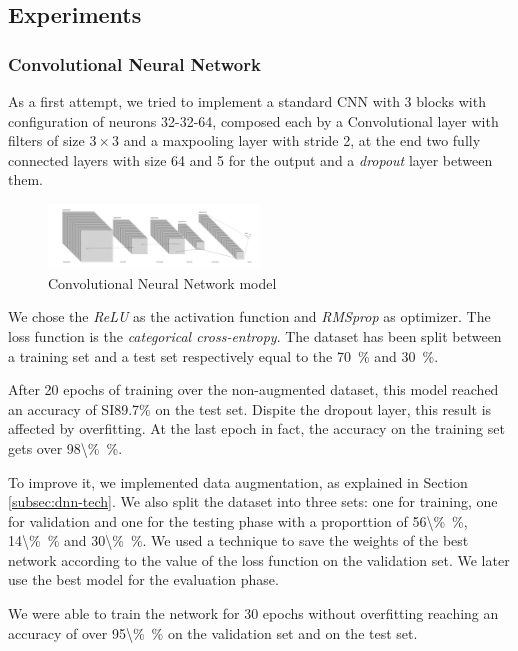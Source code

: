 \documentclass{article}
\begin{document}
\subsection{Experiments}
\label{subsec:dnn-experiments}

\subsubsection{Convolutional Neural Network}
As a first attempt, we tried to implement a standard CNN with 3 blocks with configuration of neurons 32-32-64, composed each by a Convolutional layer with filters of size $3\times 3$ and a maxpooling layer with stride 2, at the end two fully connected layers with size 64 and 5 for the output and a \emph{dropout} layer between them.
\begin{figure}[h]
    \centering
    \includegraphics[width=0.5\textwidth]{img/cnn_figure.PNG}
    \caption{Convolutional Neural Network model}
    \label{fig:CNN model}
\end{figure}

We chose the \emph{ReLU} as the activation function and \emph{RMSprop} as optimizer. The loss function is the \emph{categorical cross-entropy}. The dataset has been split between a training set and a test set respectively equal to the \SI{70}{\percent} and \SI{30}{\percent}.

After 20 epochs of training over the non-augmented dataset, this model reached an accuracy of SI{89.7\%}{\percent} on the test set.
Dispite the dropout layer, this result is affected by overfitting. At the last epoch in fact, the accuracy on the training set gets over \SI{98\%}{\percent}.

To improve it, we implemented data augmentation, as explained in Section \ref{subsec:dnn-tech}. We also split the dataset into three sets: one for training, one for validation and one for the testing phase with a proporttion of \SI{56\%}{\percent}, \SI{14\%}{\percent}  and \SI{30\%}{\percent}. We used a technique to save the weights of the best network according to the value of the loss function on the validation set. We later use the best model for the evaluation phase.

We were able to train the network for 30 epochs without overfitting reaching an accuracy of over \SI{95\%}{\percent} on the validation set and  on the test set.
\end{document}
